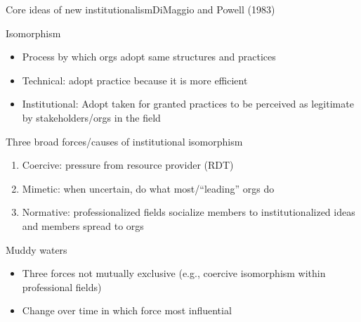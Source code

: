 \begin{frame}{Core ideas of new institutionalism}{DiMaggio and Powell (1983)}
	
	Isomorphism
	\begin{itemize}
		\item Process by which orgs adopt same structures and practices
		\item Technical: adopt practice because it is more efficient
		\item Institutional: Adopt taken for granted practices to be perceived as legitimate by stakeholders/orgs in the field
	\end{itemize}
	

	\vspace{2mm}
	Three broad forces/causes of institutional isomorphism
	\begin{enumerate}
		\item Coercive: pressure from resource provider (RDT)
		\item Mimetic: when uncertain, do what most/``leading'' orgs do
		\item Normative: professionalized fields socialize members to institutionalized ideas and members spread to orgs
	\end{enumerate}
	\vspace{2mm}
	Muddy waters
	\begin{itemize}
		\item Three forces not mutually exclusive (e.g., coercive isomorphism within professional fields)
		\item Change over time in which force most influential
	\end{itemize}
	
\end{frame}

